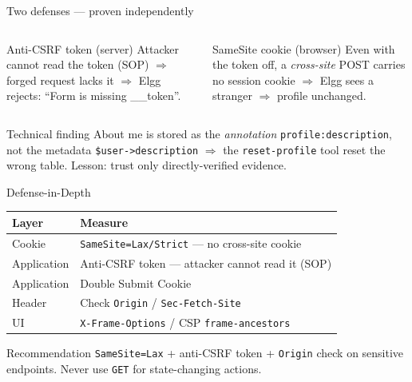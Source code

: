 \documentclass[11pt,aspectratio=169]{beamer}
\begin{document}
\begin{frame}{Two defenses — proven independently}
  \footnotesize
  \begin{columns}[t]
      \begin{block}{Anti-CSRF token (server)}
        \scriptsize Attacker cannot read the token (SOP) $\Rightarrow$ forged request lacks it $\Rightarrow$ Elgg rejects: \alert{``Form is missing \_\_token''}.
      \end{block}
      \begin{block}{SameSite cookie (browser)}
        \scriptsize Even with the token off, a \emph{cross-site} POST carries no session cookie $\Rightarrow$ Elgg sees a stranger $\Rightarrow$ profile unchanged.
      \end{block}
  \end{columns}
  \vfill
  \begin{alertblock}{Technical finding}
    \scriptsize About me is stored as the \emph{annotation} \texttt{profile:description}, not the metadata \texttt{\$user->description} $\Rightarrow$ the \texttt{reset-profile} tool reset the wrong table. Lesson: trust only directly-verified evidence.
  \end{alertblock}
\end{frame}

\begin{frame}{Defense-in-Depth}
  \footnotesize
  \begin{tabular}{ll}
    \toprule
    \textbf{Layer} & \textbf{Measure}\\
    \midrule
    Cookie & \texttt{SameSite=Lax/Strict} — no cross-site cookie\\
    Application & Anti-CSRF token — attacker cannot read it (SOP)\\
    Application & Double Submit Cookie\\
    Header & Check \texttt{Origin} / \texttt{Sec-Fetch-Site}\\
    UI & \texttt{X-Frame-Options} / CSP \texttt{frame-ancestors}\\
    \bottomrule
  \end{tabular}
  \medskip
  \begin{block}{Recommendation}
    \footnotesize \texttt{SameSite=Lax} + anti-CSRF token + \texttt{Origin} check on sensitive endpoints. Never use \texttt{GET} for state-changing actions.
  \end{block}
\end{frame}
\end{document}
